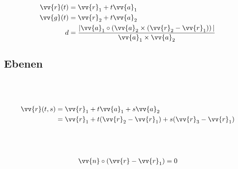 \begin{boxleft}
\\
\\
\\
\end{boxleft}\begin{boxrightshaded}
\begin{align} 
\vv{r}(t) &=\vv{r}_1+t\vv{a}_1\\
\vv{g}(t) &=\vv{r}_2+t\vv{a}_2\\
d&=\frac{|\vv{a}_1\circ\left(\vv{a}_2\times\left(\vv{r}_2-\vv{r}_1\right)\right)|}{\vv{a}_1\times\vv{a}_2}
\end{align}\end{boxrightshaded}

\subsection{Ebenen}

\begin{boxleft}
\\
\\
\end{boxleft}\begin{boxrightshaded}
\begin{align} 
\vv{r}(t,s) &=\vv{r}_1+t\vv{a}_1+s\vv{a}_2\\
	    &=\vv{r}_1+t(\vv{r}_2-\vv{r}_1)+s(\vv{r}_3-\vv{r}_1)
\end{align}\end{boxrightshaded}

\begin{boxleft}
\\
\\
\end{boxleft}\begin{boxrightshaded}
\begin{align} 
\vv{n}\circ\left(\vv{r}-\vv{r}_1\right)=0
\end{align}\end{boxrightshaded}


